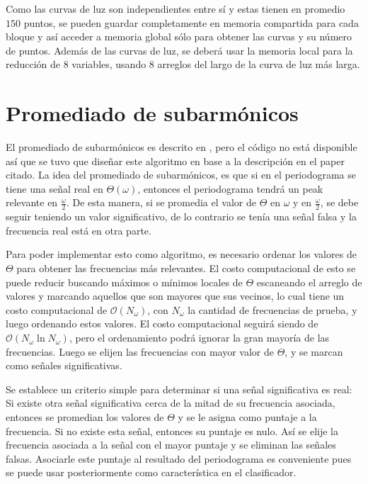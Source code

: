 Como las curvas de luz son independientes entre sí y estas tienen en promedio $150$ puntos, se pueden guardar completamente en memoria compartida para cada bloque y así acceder a memoria global sólo para obtener las curvas y su número de puntos. Además de las curvas de luz, se deberá usar la memoria local para la reducción de 8 variables, usando 8 arreglos del largo de la curva de luz más larga. 

\section{Promediado de subarmónicos}\label{sec:subarmonicos-diseno}
El promediado de subarmónicos es descrito en \cite{graham-entropy}, pero el código no está disponible así que se tuvo que diseñar este algoritmo en base a la descripción en el paper citado. La idea del promediado de subarmónicos, es que si en el periodograma se tiene una señal real en $\Theta(\omega)$, entonces el periodograma tendrá un peak relevante en $\frac{\omega}{2}$. De esta manera, si se promedia el valor de $\Theta$ en $\omega$ y en $\frac{\omega}{2}$, se debe seguir teniendo un valor significativo, de lo contrario se tenía una señal falsa y la frecuencia real está en otra parte.

Para poder implementar esto como algoritmo, es necesario ordenar los valores de $\Theta$ para obtener las frecuencias más relevantes. El costo computacional de esto se puede reducir buscando máximos o mínimos locales de $\Theta$ escaneando el arreglo de valores y marcando aquellos que son mayores que sus vecinos, lo cual tiene un costo computacional de $\mathcal O(N_\omega)$, con $N_\omega$ la cantidad de frecuencias de prueba, y luego ordenando estos valores. El costo computacional seguirá siendo de $\mathcal O (N_\omega \ln N_\omega)$, pero el ordenamiento podrá ignorar la gran mayoría de las frecuencias. Luego se elijen las frecuencias con mayor valor de $\Theta$, y se marcan como señales significativas.

Se establece un criterio simple para determinar si una señal significativa es real: Si existe otra señal significativa cerca de la mitad de su frecuencia asociada, entonces se promedian los valores de $\Theta$ y se le asigna como puntaje a la frecuencia. Si no existe esta señal, entonces su puntaje es nulo. Así se elije la frecuencia asociada a la señal con el mayor puntaje y se eliminan las señales falsas. Asociarle este puntaje al resultado del periodograma es conveniente pues se puede usar posteriormente como característica en el clasificador.

